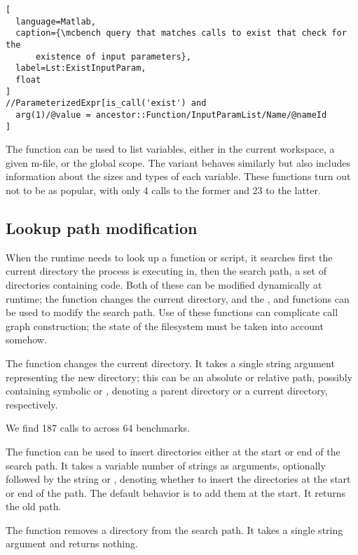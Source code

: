 \begin{lstlisting}[
  language=Matlab,
  caption={\mcbench query that matches calls to exist that check for the
      existence of input parameters},
  label=Lst:ExistInputParam,
  float
]
//ParameterizedExpr[is_call('exist') and
  arg(1)/@value = ancestor::Function/InputParamList/Name/@nameId
]
\end{lstlisting}

The  function can be used to list variables, either in the current
workspace, a given m-file, or the global scope. The  variant behaves
similarly but also includes information about the sizes and types of each
variable. These functions turn out not to be as popular, with only 4 calls to
the former and 23 to the latter.

\subsection{Lookup path modification}

When the \matlab runtime needs to look up a function or script, it searches
first the current directory the process is executing in, then the \matlab search
path, a set of directories containing \matlab code. Both of these can be
modified dynamically at runtime; the  function changes the current
directory, and the ,  and  functions can
be used to modify the search path. Use of these functions can complicate call
graph construction; the state of the filesystem must be taken into account
somehow.

The  function changes the current directory. It takes a single string
argument representing the new directory; this can be an absolute or relative
path, possibly containing symbolic  or , denoting a parent
directory or a current directory, respectively.

We find 187 calls to  across 64 benchmarks.

The  function can be used to insert directories either at the
start or end of the \matlab search path. It takes a variable number of strings
as arguments, optionally followed by the string  or
, denoting whether to insert the directories at the start or end
of the path. The default behavior is to add them at the start. It returns the
old path.

The  function removes a directory from the search path. It takes a
single string argument and returns nothing.

